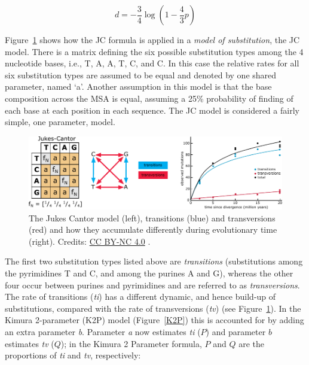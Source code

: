 \begin{equation}
d = -\frac{3}{4} \log{\left(1 - \frac{4}{3}p\right)}
\end{equation}

Figure~\ref{JC_alt} shows how the JC formula is applied in a \textit{model of substitution}, the JC model.
There is a matrix defining the six possible substitution types among the 4 nucleotide bases, i.e., T\leftrightarrowC, A\leftrightarrowG, A\leftrightarrowT, T\leftrightarrowG, C\leftrightarrowG, and C\leftrightarrowA.
In this case the relative rates for all six substitution types are assumed to be equal and denoted by one shared parameter, named `a'.
Another assumption in this model is that the base composition across the MSA is equal, assuming a 25\% probability of finding of each base at each position in each sequence.
The JC model is considered a fairly simple, one parameter, model.


\begin{figure}[!htbp]
\centering
\includegraphics[width=0.7\linewidth]{files/JC_alt-3246e60df7eeddaa4094ea98776fc4f0.pdf}
\caption[]{The Jukes Cantor model (left), transitions (blue) and transversions (red) and how they accumulate differently during evolutionary time (right).
Credits: \href{https://creativecommons.org/licenses/by-nc/4.0/}{CC BY-NC 4.0} \cite{own_3_2024}.}
\label{JC_alt}
\end{figure}

The first two substitution types listed above are \textit{transitions} (substitutions among the pyrimidines T and C, and among the purines A and G), whereas the other four occur between purines and pyrimidines and are referred to as \textit{transversions}.
The rate of transitions (\textit{ti}) has a different dynamic, and hence build-up of substitutions, compared with the rate of transversions (\textit{tv}) (see Figure~\ref{JC_alt}).
In the Kimura 2-parameter (K2P) model (Figure~\ref{K2P}) this is accounted for by adding an extra parameter  \textit{b}.
Parameter \textit{a} now estimates \textit{ti} ($P$) and parameter $b$ estimates \textit{tv} ($Q$); in the Kimura 2 Parameter formula, $P$ and $Q$ are the proportions of \textit{ti} and \textit{tv}, respectively:

